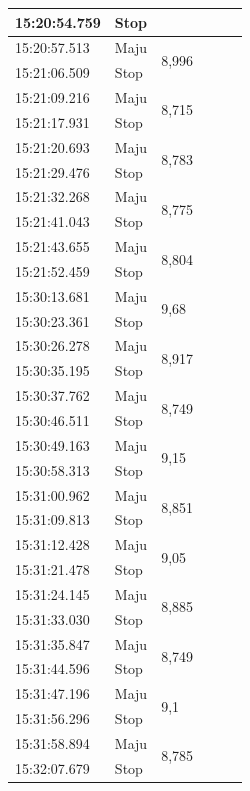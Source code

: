 \begin{longtable}{|l|l|l|l|l|l|}
  \cline{1-2}
  15:20:54.759 & Stop & \\
  \hline
  15:20:57.513 & Maju & \multirow{2}{*}{8,996} \\
  \cline{1-2}
  15:21:06.509 & Stop & \\
  \hline
  15:21:09.216 & Maju & \multirow{2}{*}{8,715} \\
  \cline{1-2}
  15:21:17.931 & Stop & \\
  \hline
  15:21:20.693 & Maju & \multirow{2}{*}{8,783} \\
  \cline{1-2}
  15:21:29.476 & Stop & \\
  \hline
  15:21:32.268 & Maju & \multirow{2}{*}{8,775} \\
  \cline{1-2}
  15:21:41.043 & Stop & \\
  \hline
  15:21:43.655 & Maju & \multirow{2}{*}{8,804} \\
  \cline{1-2}
  15:21:52.459 & Stop & \\
  \hline
  15:30:13.681 & Maju & \multirow{2}{*}{9,68} \\
  \cline{1-2}
  15:30:23.361 & Stop & \\
  \hline
  15:30:26.278 & Maju & \multirow{2}{*}{8,917} \\
  \cline{1-2}
  15:30:35.195 & Stop & \\
  \hline
  15:30:37.762 & Maju & \multirow{2}{*}{8,749} \\
  \cline{1-2}
  15:30:46.511 & Stop & \\
  \hline
  15:30:49.163 & Maju & \multirow{2}{*}{9,15} \\
  \cline{1-2}
  15:30:58.313 & Stop & \\
  \hline
  15:31:00.962 & Maju & \multirow{2}{*}{8,851} \\
  \cline{1-2}
  15:31:09.813 & Stop & \\
  \hline
  15:31:12.428 & Maju & \multirow{2}{*}{9,05} \\
  \cline{1-2}
  15:31:21.478 & Stop & \\
  \hline
  15:31:24.145 & Maju & \multirow{2}{*}{8,885} \\
  \cline{1-2}
  15:31:33.030 & Stop & \\
  \hline
  15:31:35.847 & Maju & \multirow{2}{*}{8,749} \\
  \cline{1-2}
  15:31:44.596 & Stop & \\
  \hline
  15:31:47.196 & Maju & \multirow{2}{*}{9,1} \\
  \cline{1-2}
  15:31:56.296 & Stop & \\
  \hline
  15:31:58.894 & Maju & \multirow{2}{*}{8,785} \\
  \cline{1-2}
  15:32:07.679 & Stop & \\
  \hline
\end{longtable}


